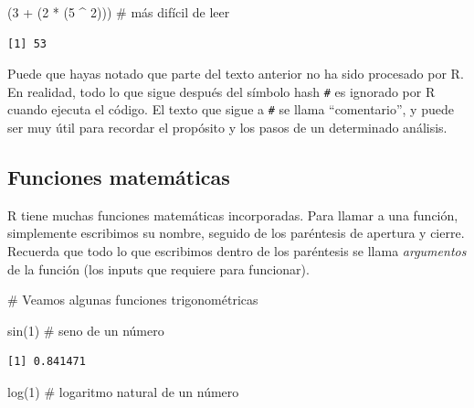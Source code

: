 \documentclass[
  letterpaper,
  DIV=11,
  numbers=noendperiod]{scrreprt}
\newenvironment{Shaded}{\begin{snugshade}}{\end{snugshade}}
\newcommand{\CommentTok}[1]{\textcolor[rgb]{0.37,0.37,0.37}{#1}}
\newcommand{\DecValTok}[1]{\textcolor[rgb]{0.68,0.00,0.00}{#1}}
\newcommand{\FunctionTok}[1]{\textcolor[rgb]{0.28,0.35,0.67}{#1}}
\newcommand{\NormalTok}[1]{\textcolor[rgb]{0.00,0.23,0.31}{#1}}
\newcommand{\SpecialCharTok}[1]{\textcolor[rgb]{0.37,0.37,0.37}{#1}}
\begin{document}
\begin{Shaded}
\begin{Highlighting}[]
\NormalTok{(}\DecValTok{3} \SpecialCharTok{+}\NormalTok{ (}\DecValTok{2} \SpecialCharTok{*}\NormalTok{ (}\DecValTok{5} \SpecialCharTok{\^{}} \DecValTok{2}\NormalTok{))) }\CommentTok{\# más difícil de leer}
\end{Highlighting}
\end{Shaded}

\begin{verbatim}
[1] 53
\end{verbatim}

Puede que hayas notado que parte del texto anterior no ha sido procesado
por R. En realidad, todo lo que sigue después del símbolo hash
\texttt{\#} es ignorado por R cuando ejecuta el código. El texto que
sigue a \texttt{\#} se llama ``comentario'', y puede ser muy útil para
recordar el propósito y los pasos de un determinado análisis.

\hypertarget{funciones-matemuxe1ticas}{%
\subsection{Funciones matemáticas}\label{funciones-matemuxe1ticas}}

R tiene muchas funciones matemáticas incorporadas. Para llamar a una
función, simplemente escribimos su nombre, seguido de los paréntesis de
apertura y cierre. Recuerda que todo lo que escribimos dentro de los
paréntesis se llama \emph{argumentos} de la función (los inputs que
requiere para funcionar).

\begin{Shaded}
\begin{Highlighting}[]
\CommentTok{\# Veamos algunas funciones trigonométricas}

\FunctionTok{sin}\NormalTok{(}\DecValTok{1}\NormalTok{)  }\CommentTok{\# seno de un número}
\end{Highlighting}
\end{Shaded}

\begin{verbatim}
[1] 0.841471
\end{verbatim}

\begin{Shaded}
\begin{Highlighting}[]
\FunctionTok{log}\NormalTok{(}\DecValTok{1}\NormalTok{)  }\CommentTok{\# logaritmo natural de un número}
\end{Highlighting}
\end{Shaded}
\end{document}
